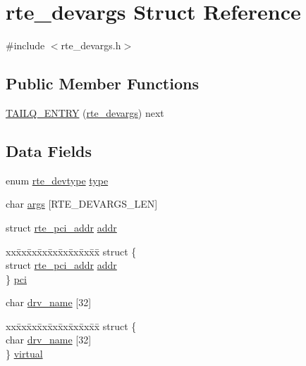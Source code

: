 \hypertarget{structrte__devargs}{}\section{rte\+\_\+devargs Struct Reference}
\label{structrte__devargs}


{\ttfamily \#include $<$rte\+\_\+devargs.\+h$>$}

\subsection*{Public Member Functions}
\begin{DoxyCompactItemize}
\item 
\hyperlink{structrte__devargs_a3d9ccd9f22f3488e05364ebc35fa78df}{T\+A\+I\+L\+Q\+\_\+\+E\+N\+T\+R\+Y} (\hyperlink{structrte__devargs}{rte\+\_\+devargs}) next
\end{DoxyCompactItemize}
\subsection*{Data Fields}
\begin{DoxyCompactItemize}
\item 
enum \hyperlink{rte__devargs_8h_a8852886cdc234b20769fdd443d24dd46}{rte\+\_\+devtype} \hyperlink{structrte__devargs_ad24886fe74539d51dfc8be0cb7a06cfc}{type}
\item 
char \hyperlink{structrte__devargs_ac8d946f012675cf93396b453c96d07da}{args} \mbox{[}R\+T\+E\+\_\+\+D\+E\+V\+A\+R\+G\+S\+\_\+\+L\+E\+N\mbox{]}
\item 
struct \hyperlink{structrte__pci__addr}{rte\+\_\+pci\+\_\+addr} \hyperlink{structrte__devargs_ac06e27d1cf6546e487214cc7a4cbd523}{addr}
\item 
\begin{tabbing}
xx\=xx\=xx\=xx\=xx\=xx\=xx\=xx\=xx\=\kill
struct \{\\
\>struct \hyperlink{structrte__pci__addr}{rte\_pci\_addr} \hyperlink{structrte__devargs_ac06e27d1cf6546e487214cc7a4cbd523}{addr}\\
\} \hyperlink{structrte__devargs_ae26812bc74640366c15cde4f2d4b4926}{pci}\\

\end{tabbing}\item 
char \hyperlink{structrte__devargs_a1764942a3f4ef98f96b56f34528c8896}{drv\+\_\+name} \mbox{[}32\mbox{]}
\item 
\begin{tabbing}
xx\=xx\=xx\=xx\=xx\=xx\=xx\=xx\=xx\=\kill
struct \{\\
\>char \hyperlink{structrte__devargs_a1764942a3f4ef98f96b56f34528c8896}{drv\_name} \mbox{[}32\mbox{]}\\
\} \hyperlink{structrte__devargs_acf02e25b6dc010c2369b80615055b5b4}{virtual}\\

\end{tabbing}\end{DoxyCompactItemize}


